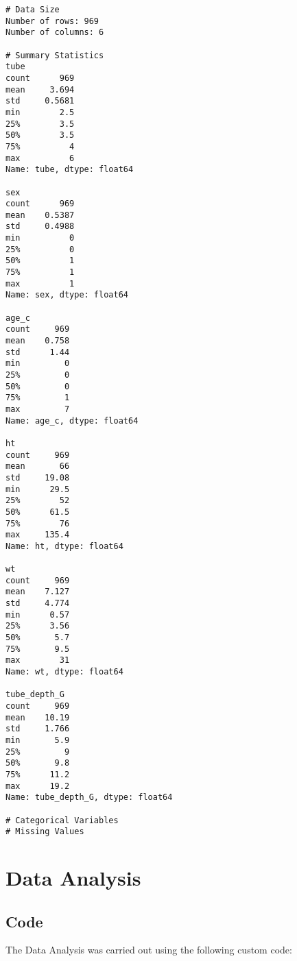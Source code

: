 \documentclass[11pt]{article}
\begin{document}
\begin{Verbatim}[tabsize=4]
# Data Size
Number of rows: 969
Number of columns: 6

# Summary Statistics
tube
count      969
mean     3.694
std     0.5681
min        2.5
25%        3.5
50%        3.5
75%          4
max          6
Name: tube, dtype: float64

sex
count      969
mean    0.5387
std     0.4988
min          0
25%          0
50%          1
75%          1
max          1
Name: sex, dtype: float64

age_c
count     969
mean    0.758
std      1.44
min         0
25%         0
50%         0
75%         1
max         7
Name: age_c, dtype: float64

ht
count     969
mean       66
std     19.08
min      29.5
25%        52
50%      61.5
75%        76
max     135.4
Name: ht, dtype: float64

wt
count     969
mean    7.127
std     4.774
min      0.57
25%      3.56
50%       5.7
75%       9.5
max        31
Name: wt, dtype: float64

tube_depth_G
count     969
mean    10.19
std     1.766
min       5.9
25%         9
50%       9.8
75%      11.2
max      19.2
Name: tube_depth_G, dtype: float64

# Categorical Variables
# Missing Values

\end{Verbatim}

\section{Data Analysis}
\subsection{{Code}}
The Data Analysis was carried out using the following custom code:
\end{document}
